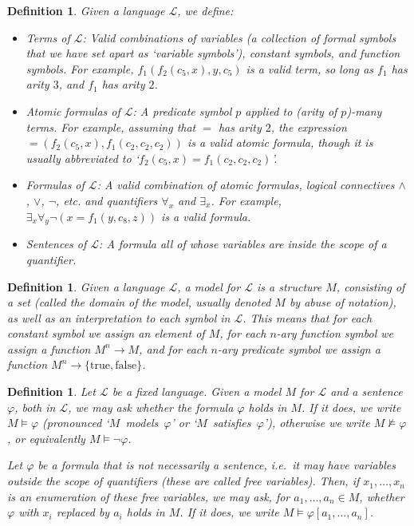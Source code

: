 \documentclass{article}
\newtheorem{definition}[theorem]{Definition}
\theoremstyle{nonumberplain}
\newcommand{\Lang}{\mathcal{L}}
\begin{document}
\begin{definition}\label{def:formula}
Given a language $\Lang$, we define:
\begin{itemize}
\item Terms of $\Lang$: Valid combinations of variables (a collection of formal symbols that we have set apart as `variable symbols'), constant symbols, and function symbols. For example, $f_1(f_2(c_5, x), y, c_5)$ is a valid term, so long as $f_1$ has arity $3$, and $f_1$ has arity $2$.

\item Atomic formulas of $\Lang$: A predicate symbol $p$ applied to (arity of $p$)-many terms. For example, assuming that $=$ has arity $2$, the expression $=(f_2(c_5,x), f_1(c_2,c_2,c_2))$ is a valid atomic formula, though it is usually abbreviated to `$f_2(c_5,x) = f_1(c_2,c_2,c_2)$'.

\item Formulas of $\Lang$: A valid combination of atomic formulas, logical connectives $\land$, $\lor$, $\neg$, etc. and quantifiers $\forall_x$ and $\exists_x$. For example, $\exists_x \forall_y \neg(x = f_1(y, c_8,z))$ is a valid formula.

\item Sentences of $\Lang$: A formula all of whose variables are inside the scope of a quantifier.
\end{itemize}
\end{definition}

\begin{definition}
Given a language $\Lang$, a \emph{model for $\Lang$} is a structure $M$, consisting of a set (called the domain of the model, usually denoted $M$ by abuse of notation), as well as an interpretation to each symbol in $\Lang$. This means that for each constant symbol we assign an element of $M$, for each $n$-ary function symbol we assign a function $M^n \to M$, and for each $n$-ary predicate symbol we assign a function $M^n \to \{\text{true}, \text{false}\}$.
\end{definition}

\begin{definition}
Let $\Lang$ be a fixed language. Given a model $M$ for $\Lang$ and a sentence $\varphi$, both in $\Lang$, we may ask whether the formula $\varphi$ holds in $M$. If it does, we write $M \vDash \varphi$ (pronounced `$M$~models~$\varphi$' or `$M$~satisfies~$\varphi$'), otherwise we write $M \nvDash \varphi$, or equivalently $M \vDash \neg\varphi$.

Let $\varphi$ be a formula that is not necessarily a sentence, i.e.\ it may have variables outside the scope of quantifiers (these are called free variables). Then, if $x_1, \dots, x_n$ is an enumeration of these free variables, we may ask, for $a_1, \dots, a_n \in M$, whether $\varphi$ with $x_i$ replaced by $a_i$ holds in $M$. If it does, we write $M \vDash \varphi[a_1, \dots, a_n]$.
\end{definition}
\end{document}

